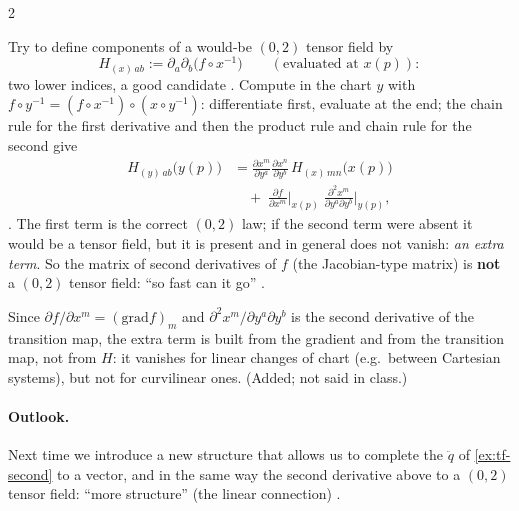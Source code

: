 \begin{paracol}{2}
\begin{example}\label{ex:tf-hessian}
Try to define components of a would-be $(0,2)$ tensor field by
\[
  H_{(x)\,ab}:=\partial_a\partial_b\bigl(f\circ x^{-1}\bigr)\qquad(\text{evaluated at }x(p)):
\]
two lower indices, a good candidate . Compute in the chart $y$ with
$f\circ y^{-1}=(f\circ x^{-1})\circ(x\circ y^{-1})$: differentiate first, evaluate at the end; the chain rule for the first
derivative and then the product rule and chain rule for the second give
\begin{align*}
  H_{(y)\,ab}\bigl(y(p)\bigr)
  &=\frac{\partial x^m}{\partial y^a}\frac{\partial x^n}{\partial y^b}\,H_{(x)\,mn}\bigl(x(p)\bigr)\\
  &\quad+\;\frac{\partial f}{\partial x^m}\Big|_{x(p)}\;\frac{\partial^2x^m}{\partial y^a\partial y^b}\Big|_{y(p)},
\end{align*}
.
The first term is the correct $(0,2)$ law; if the second term were absent it would be a tensor field, but it is present and
in general does not vanish: \emph{an extra term}. So the matrix of second derivatives of $f$ (the Jacobian-type matrix) is
\textbf{not} a $(0,2)$ tensor field: ``so fast can it go'' .
\end{example}
\begin{coursenote}
Since $\partial f/\partial x^m=(\mathrm{grad}f)_m$ and $\partial^2x^m/\partial y^a\partial y^b$ is the second derivative of the transition
map, the extra term is built from the gradient and from the transition map, not from $H$: it vanishes for linear changes of chart
(e.g.\ between Cartesian systems), but not for curvilinear ones. (Added; not said in class.)
\end{coursenote}
\paragraph{Outlook.} Next time we introduce a new structure that allows us to complete the $\ddot q$ of \cref{ex:tf-second}
to a vector, and in the same way the second derivative above to a $(0,2)$ tensor field: ``more structure'' (the linear connection)
.


\end{paracol}
